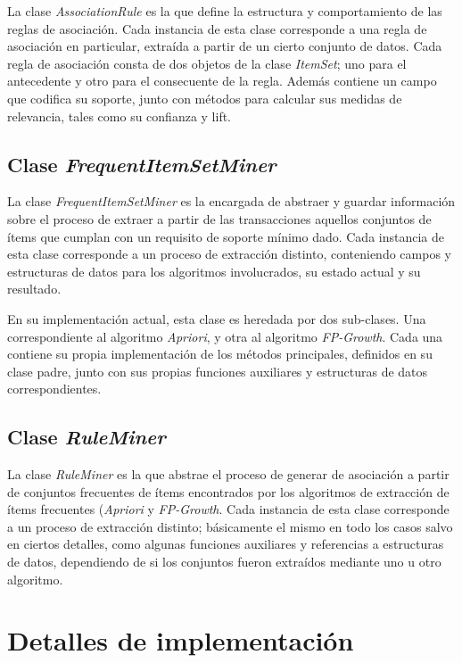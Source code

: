 La clase \textit{AssociationRule} es la que define la estructura y comportamiento de las reglas de asociación. Cada instancia de esta clase corresponde a una regla de asociación en particular, extraída a partir de un cierto conjunto de datos. Cada regla de asociación consta de dos objetos de la clase \textit{ItemSet}; uno para el antecedente y otro para el consecuente de la regla. Además contiene un campo que codifica su soporte, junto con métodos para calcular sus medidas de relevancia, tales como su confianza y lift.

\subsection{Clase \textit{FrequentItemSetMiner}}

La clase \textit{FrequentItemSetMiner} es la encargada de abstraer y guardar información sobre el proceso de extraer a partir de las transacciones aquellos conjuntos de ítems que cumplan con un requisito de soporte mínimo dado. Cada instancia de esta clase corresponde a un proceso de extracción distinto, conteniendo campos y estructuras de datos para los algoritmos involucrados, su estado actual y su resultado.

En su implementación actual, esta clase es heredada por dos sub-clases. Una correspondiente al algoritmo \textit{Apriori}, y otra al algoritmo \textit{FP-Growth}. Cada una contiene su propia implementación de los métodos principales, definidos en su clase padre, junto con sus propias funciones auxiliares y estructuras de datos correspondientes.

\subsection{Clase \textit{RuleMiner}}

La clase \textit{RuleMiner} es la que abstrae el proceso de generar de asociación a partir de conjuntos frecuentes de ítems encontrados por los algoritmos de extracción de ítems frecuentes (\textit{Apriori} y \textit{FP-Growth}. Cada instancia de esta clase corresponde a un proceso de extracción distinto; básicamente el mismo en todo los casos salvo en ciertos detalles, como algunas funciones auxiliares y referencias a estructuras de datos, dependiendo de si los conjuntos fueron extraídos mediante uno u otro algoritmo.

\section{Detalles de implementación}

